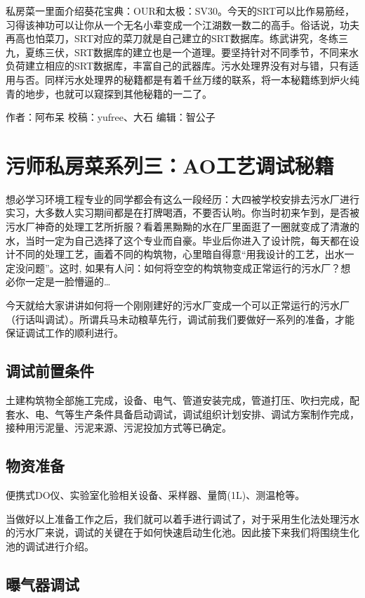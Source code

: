 \documentclass[]{book}
\begin{document}
私房菜一里面介绍葵花宝典：OUR和太极：SV30。今天的SRT可以比作易筋经，习得该神功可以让你从一个无名小辈变成一个江湖数一数二的高手。俗话说，功夫再高也怕菜刀，SRT对应的菜刀就是自己建立的SRT数据库。练武讲究，冬练三九，夏练三伏，SRT数据库的建立也是一个道理。要坚持针对不同季节，不同来水负荷建立相应的SRT数据库，丰富自己的武器库。污水处理界没有对与错，只有适用与否。同样污水处理界的秘籍都是有着千丝万缕的联系，将一本秘籍练到炉火纯青的地步，也就可以窥探到其他秘籍的一二了。

作者：阿布呆 校稿：yufree、大石 编辑：智公子

\section{污师私房菜系列三：AO工艺调试秘籍}\label{ao}

想必学习环境工程专业的同学都会有这么一段经历：大四被学校安排去污水厂进行实习，大多数人实习期间都是在打牌喝酒，不要否认哟。你当时初来乍到，是否被污水厂神奇的处理工艺所折服？看着黑黝黝的水在厂里面逛了一圈就变成了清澈的水，当时一定为自己选择了这个专业而自豪。毕业后你进入了设计院，每天都在设计不同的处理工艺，画着不同的构筑物，心里暗自得意``用我设计的工艺，出水一定没问题''。这时,
如果有人问：如何将空空的构筑物变成正常运行的污水厂？想必你一定是一脸懵逼的\ldots{}

今天就给大家讲讲如何将一个刚刚建好的污水厂变成一个可以正常运行的污水厂（行话叫调试）。所谓兵马未动粮草先行，调试前我们要做好一系列的准备，才能保证调试工作的顺利进行。

\subsection{调试前置条件}

土建构筑物全部施工完成，设备、电气、管道安装完成，管道打压、吹扫完成，配套水、电、气等生产条件具备启动调试，调试组织计划安排、调试方案制作完成，接种用污泥量、污泥来源、污泥投加方式等已确定。

\subsection{物资准备}

便携式DO仪、实验室化验相关设备、采样器、量筒(1L)、测温枪等。

当做好以上准备工作之后，我们就可以着手进行调试了，对于采用生化法处理污水的污水厂来说，调试的关键在于如何快速启动生化池。因此接下来我们将围绕生化池的调试进行介绍。

\subsection{曝气器调试}
\end{document}
